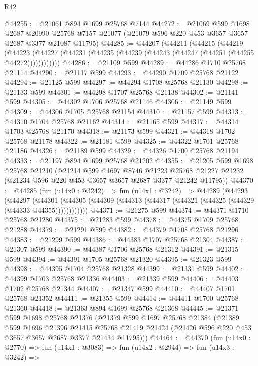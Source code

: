 \begin{lexlean}{R42}
\begin{coremodule}
@44255 := @21061 @894 @1699 @25768 @7144
@44272 := @21069
    @599
    @1698
    @2687
    @20990
    @25768
    @7157
    @21077
    (@21079 @596 @220 @453 @3657 @3657 @2687 @3377 @21087 @11795)
@44285 := @44207
    (@44211
      (@44215
        (@44219
          (@44223 (@44227 (@44231 (@44235 (@44239 (@44243 (@44247 (@44251 (@44255 @44272))))))))))))
@44286 := @21109 @599
@44289 := @44286 @1710 @25768 @21114
@44290 := @21117 @599
@44293 := @44290 @1709 @25768 @21122
@44294 := @21125 @599
@44297 := @44294 @1708 @25768 @21130
@44298 := @21133 @599
@44301 := @44298 @1707 @25768 @21138
@44302 := @21141 @599
@44305 := @44302 @1706 @25768 @21146
@44306 := @21149 @599
@44309 := @44306 @1705 @25768 @21154
@44310 := @21157 @599
@44313 := @44310 @1704 @25768 @21162
@44314 := @21165 @599
@44317 := @44314 @1703 @25768 @21170
@44318 := @21173 @599
@44321 := @44318 @1702 @25768 @21178
@44322 := @21181 @599
@44325 := @44322 @1701 @25768 @21186
@44326 := @21189 @599
@44329 := @44326 @1700 @25768 @21194
@44333 := @21197 @894 @1699 @25768 @21202
@44355 := @21205
    @599
    @1698
    @25768
    @21210
    (@21214
      @599
      @1697
      @8746
      @21223
      @25768
      @21227
      @21232
      (@21234 @596 @220 @453 @3657 @3657 @2687 @3377 @21242 @11795))
@44370 := @44285
    (fun (u14x0 : @3242) =>
    fun (u14x1 : @3242) =>
    @44289
      (@44293
        (@44297
          (@44301 (@44305 (@44309 (@44313 (@44317 (@44321 (@44325 (@44329 (@44333 @44355))))))))))))
@44371 := @21275 @599
@44374 := @44371 @1710 @25768 @21280
@44375 := @21283 @599
@44378 := @44375 @1709 @25768 @21288
@44379 := @21291 @599
@44382 := @44379 @1708 @25768 @21296
@44383 := @21299 @599
@44386 := @44383 @1707 @25768 @21304
@44387 := @21307 @599
@44390 := @44387 @1706 @25768 @21312
@44391 := @21315 @599
@44394 := @44391 @1705 @25768 @21320
@44395 := @21323 @599
@44398 := @44395 @1704 @25768 @21328
@44399 := @21331 @599
@44402 := @44399 @1703 @25768 @21336
@44403 := @21339 @599
@44406 := @44403 @1702 @25768 @21344
@44407 := @21347 @599
@44410 := @44407 @1701 @25768 @21352
@44411 := @21355 @599
@44414 := @44411 @1700 @25768 @21360
@44418 := @21363 @894 @1699 @25768 @21368
@44445 := @21371
    @599
    @1698
    @25768
    @21376
    (@21379
      @599
      @1697
      @25768
      @21384
      (@21389
        @599
        @1696
        @21396
        @21415
        @25768
        @21419
        @21424
        (@21426 @596 @220 @453 @3657 @3657 @2687 @3377 @21434 @11795)))
@44464 := @44370
    (fun (u14x0 : @2770) =>
    fun (u14x1 : @3083) =>
    fun (u14x2 : @2944) =>
    fun (u14x3 : @3242) =>

\end{coremodule}
\end{lexlean}
